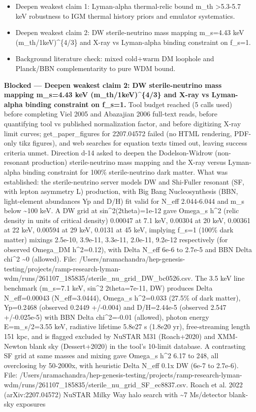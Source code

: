 \documentclass[11pt,a4paper]{article}
\begin{document}
\begin{itemize}
  \item Deepen weakest claim 1: Lyman-alpha thermal-relic bound m\_th \textgreater{}5.3-5.7 keV robustness to IGM thermal history priors and emulator systematics.
  \item Deepen weakest claim 2: DW sterile-neutrino mass mapping m\_s=4.43 keV (m\_th/1keV)\textasciicircum{}\{4/3\} and X-ray vs Lyman-alpha binding constraint on f\_s=1.
  \item Background literature check: mixed cold+warm DM loophole and Planck/BBN complementarity to pure WDM bound.
\end{itemize}
\textbf{Blocked --- Deepen weakest claim 2: DW sterile-neutrino mass mapping m\_s=4.43 keV (m\_th/1keV)\textasciicircum{}\{4/3\} and X-ray vs Lyman-alpha binding constraint on f\_s=1.} Tool budget reached (5 calls used) before completing Viel 2005 and Abazajian 2006 full-text reads, before quantifying tool vs published normalization factor, and before digitizing X-ray limit curves; get\_paper\_figures for 2207.04572 failed (no HTML rendering, PDF-only tikz figures), and web searches for equation texts timed out, leaving success criteria unmet. Direction d-14 asked to deepen the Dodelson-Widrow (non-resonant production) sterile-neutrino mass mapping and the X-ray versus Lyman-alpha binding constraint for 100\% sterile-neutrino dark matter. What was established: the sterile-neutrino server models DW and Shi-Fuller resonant (SF, with lepton asymmetry L) production, with Big Bang Nucleosynthesis (BBN, light-element abundances Yp and D/H) fit valid for N\_eff 2.044-6.044 and m\_s below \textasciitilde{}100 keV. A DW grid at sin\textasciicircum{}2(2theta)=1e-12 gave Omega\_s h\textasciicircum{}2 (relic density in units of critical density) 0.00047 at 7.1 keV, 0.00304 at 20 keV, 0.00361 at 22 keV, 0.00594 at 29 keV, 0.0131 at 45 keV, implying f\_s=1 (100\% dark matter) mixings 2.5e-10, 3.9e-11, 3.3e-11, 2.0e-11, 9.2e-12 respectively (for observed Omega\_DM h\textasciicircum{}2=0.12), with Delta N\_eff 6e-6 to 2.7e-5 and BBN Delta chi\textasciicircum{}2 \textasciitilde{}0 (allowed). File: /Users/nramachandra/hep-genesis-testing/projects/ramp-research-lyman-wdm/runs/261107\_185835/sterile\_nu\_grid\_DW\_bc0526.csv. The 3.5 keV line benchmark (m\_s=7.1 keV, sin\textasciicircum{}2 2theta=7e-11, DW) produces Delta N\_eff=0.00043 (N\_eff=3.0444), Omega\_s h\textasciicircum{}2=0.033 (27.5\% of dark matter), Yp=0.2468 (observed 0.2449 +/-0.004) and D/H=2.44e-5 (observed 2.547 +/-0.025e-5) with BBN Delta chi\textasciicircum{}2=-0.01 (allowed), photon energy E=m\_s/2=3.55 keV, radiative lifetime 5.8e27 s (1.8e20 yr), free-streaming length 151 kpc, and is flagged excluded by NuSTAR M31 (Roach+2020) and XMM-Newton blank sky (Dessert+2020) in the tool's 10-limit database. A contrasting SF grid at same masses and mixing gave Omega\_s h\textasciicircum{}2 6.17 to 248, all overclosing by 50-2000x, with heuristic Delta N\_eff 0.1x DW (6e-7 to 2.7e-6). File: /Users/nramachandra/hep-genesis-testing/projects/ramp-research-lyman-wdm/runs/261107\_185835/sterile\_nu\_grid\_SF\_ec8837.csv. Roach et al. 2022 (arXiv:2207.04572) NuSTAR Milky Way halo search with \textasciitilde{}7 Ms/detector blank-sky exposures 
\end{document}
